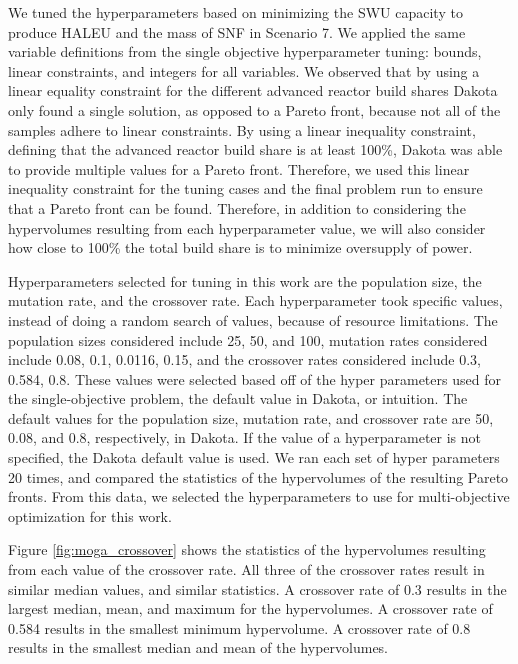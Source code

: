 We tuned the hyperparameters based on minimizing the \gls{SWU} capacity 
to produce \gls{HALEU} and the mass of \gls{SNF} in Scenario 7.
We applied the same variable definitions 
from the single objective hyperparameter 
tuning: bounds, linear constraints, and integers for 
all variables. We observed that by using a linear equality constraint for 
the different advanced reactor build shares 
Dakota only found a single solution, as opposed to a Pareto front, because 
not all of the samples adhere to linear constraints. By using a linear 
inequality constraint, defining that the advanced reactor build share is 
at least 100\%, Dakota was able to provide multiple values for a Pareto front. 
Therefore, we used this linear inequality constraint for the tuning cases and 
the final problem run to ensure that a Pareto front can be found. Therefore, 
in addition to considering the hypervolumes resulting from each hyperparameter 
value, we will also consider how close to 100\% the total build share is 
to minimize oversupply of power.

Hyperparameters selected for tuning in this work are the 
population size, the mutation rate, and the crossover rate. Each 
hyperparameter took specific values, instead of doing a random 
search of values, because of resource limitations. The population 
sizes considered include 25, 50, and 100, mutation rates considered 
include 0.08, 0.1, 0.0116, 0.15, and the crossover rates 
considered include 0.3, 0.584, 0.8. These values 
were selected based off of the hyper parameters used for the single-objective 
problem, the default value in Dakota, or intuition. The default values for 
the population size, mutation rate, and crossover rate are 50, 
0.08, and 0.8, respectively, in Dakota. If the value of a 
hyperparameter is not specified, the Dakota default value is used.  
We ran each set of hyper 
parameters 20 times, and compared the statistics of the hypervolumes of 
the resulting Pareto fronts. From this data, we selected the 
hyperparameters to use for multi-objective optimization for this work. 

Figure \ref{fig:moga_crossover} shows the statistics of the hypervolumes 
resulting from each value of the crossover rate. All three of the 
crossover rates result in similar median values, and similar statistics. 
A crossover rate of 
0.3 results in the largest median, mean, and maximum for the 
hypervolumes. A crossover rate of 0.584 results in the smallest minimum 
hypervolume. A crossover rate of 0.8 results in the smallest median 
and mean of the hypervolumes. 

